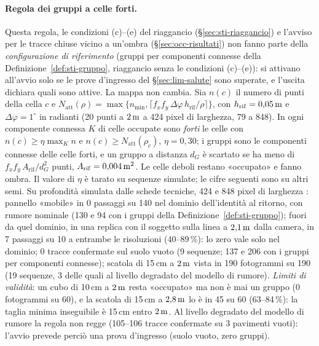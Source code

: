 \paragraph{Regola dei gruppi a celle forti.} Questa regola, le condizioni (c)--(e) del riaggancio (\S\ref{sec:sti-riaggancio}) e l'avviso per le tracce chiuse vicino a un'ombra (\S\ref{sec:occ-risultati}) non fanno parte della \emph{configurazione di riferimento} (gruppi per componenti connesse della Definizione~\ref{def:sti-gruppo}, riaggancio senza le condizioni (c)--(e)): si attivano all'avvio solo se le prove d'ingresso del \S\ref{sec:lim-salute} sono superate, e l'uscita dichiara quali sono attive. La mappa non cambia. Sia $n(c)$ il numero di punti della cella $c$ e $N_{\mathrm{att}}(\rho)=\max\{n_{\min},\lceil f_xf_y\,\Delta\varphi\,h_{\mathrm{rif}}/\rho\rceil\}$, con $h_{\mathrm{rif}}=0{,}05\,\mathrm{m}$ e $\Delta\varphi=1^\circ$ in radianti (20 punti a $2\,\mathrm{m}$ a 424 pixel di larghezza, 79 a 848). In ogni componente connessa $K$ di celle occupate sono \emph{forti} le celle con $n(c)\ge\eta\max_K n$ e $n(c)\ge N_{\mathrm{att}}(\rho_c)$, $\eta=0{,}30$; i gruppi sono le componenti connesse delle celle forti, e un gruppo a distanza $d_G$ è scartato se ha meno di $f_xf_y\,A_{\mathrm{rif}}/d_G^2$ punti, $A_{\mathrm{rif}}=0{,}004\,\mathrm{m^2}$. Le celle deboli restano «occupato» e fanno ombra. Il valore di $\eta$ è tarato su sequenze simulate; le cifre seguenti sono su altri semi. Su profondità simulata dalle schede tecniche, 424 e 848 pixel di larghezza : pannello «mobile» in 0 passaggi su 140 nel dominio dell'identità al ritorno, con rumore nominale (130 e 94 con i gruppi della Definizione~\ref{def:sti-gruppo}); fuori da quel dominio, in una replica con il soggetto sulla linea a $2{,}1\,\mathrm{m}$ dalla camera, in 7 passaggi su 10 a entrambe le risoluzioni (40--89\,\%): lo zero vale solo nel dominio; 0 tracce confermate sul suolo vuoto (9 sequenze; 137 e 206 con i gruppi per componenti connesse); scatola di 15\,cm a $2\,\mathrm{m}$ vista in 190 fotogrammi su 190 (19 sequenze, 3 delle quali al livello degradato del modello di rumore). \emph{Limiti di validità}: un cubo di 10\,cm a $2\,\mathrm{m}$ resta «occupato» ma non è mai un gruppo (0 fotogrammi su 60), e la scatola di 15\,cm a $2{,}8\,\mathrm{m}$ lo è in 45 su 60 (63--84\,\%): la taglia minima inseguibile è 15\,cm entro $2\,\mathrm{m}$. Al livello degradato del modello di rumore la regola non regge (105--106 tracce confermate su 3 pavimenti vuoti): l'avvio prevede perciò una prova d'ingresso (suolo vuoto, zero gruppi).

